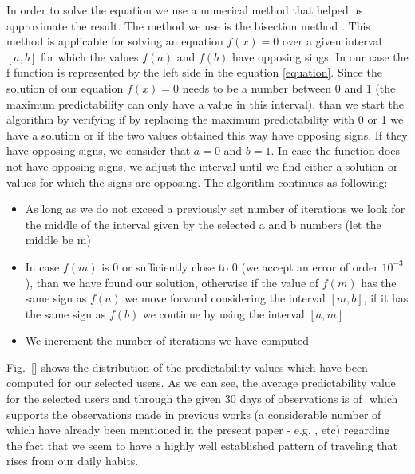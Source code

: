 In order to solve the equation we use a numerical method that helped us
approximate the result. The method we use is the bisection method \cite{faires}.
This method is applicable for solving an equation $f(x) = 0$ over a given
interval $[a,b]$ for which the values $f(a)$ and $f(b)$ have opposing sings. In
our case the f function is represented by the left side in the equation
\ref{equation}. Since the solution of our equation $f(x) = 0$ needs to be a
number between 0 and 1 (the maximum predictability can only have a value in this
interval), than we start the algorithm by verifying if by replacing the maximum
predictability with 0 or 1 we have a solution or if the two values obtained this
way have opposing signs. If they have opposing signs, we consider that $a = 0$
and $b = 1$. In case the function does not have opposing signs, we adjust the
interval until we find either a solution or values for which the signs are
opposing. The algorithm continues as following:
\begin{itemize}
  \item As long as we do not exceed a previously set number of iterations we
  look for the middle of the interval given by the selected a and b numbers
  (let the middle be m)
  \item In case $f(m)$ is 0 or sufficiently close to 0 (we accept an error of
  order $10^{-3}$), than we have found our solution, otherwise if the value of
  $f(m)$ has the same sign as $f(a)$ we move forward considering the interval
  $[m,b]$, if it has the same sign as $f(b)$ we continue by using the interval
  $[a,m]$
  \item We increment the number of iterations we have computed
\end{itemize}

Fig.~\ref{} shows the distribution of the predictability values which have been
computed for our selected users. As we can see, the average predictability value
for the selected users and through the given $30$ days of observations is of $ $
which supports the observations made in previous works (a considerable number of
which have already been mentioned in the present paper - e.g.
\cite{song2010limits}, \cite{Barabasi08} etc) regarding the fact that we seem to
have a highly well established pattern of traveling that rises from our daily
habits.
